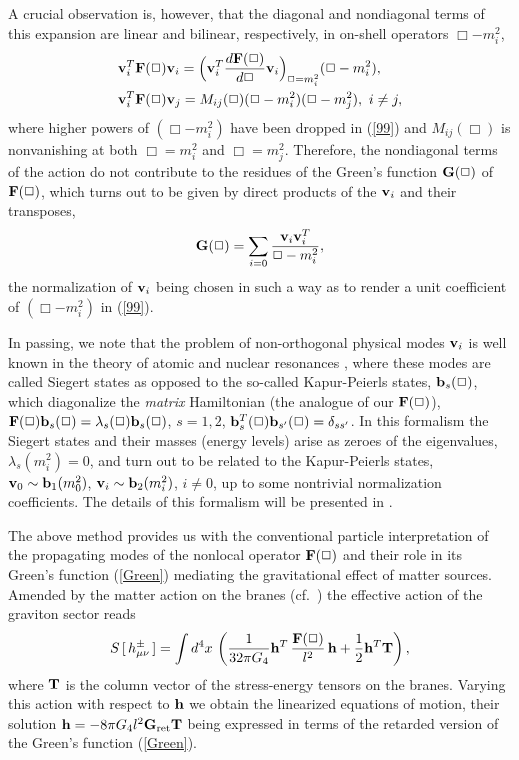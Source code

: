 \documentclass[a4paper,prl,twocolumn,amsmath,amssymb,showpacs]{revtex4}
\begin{document}
A crucial observation is, however, that the diagonal and nondiagonal 
terms of this expansion are linear and bilinear, respectively, in on-shell  
operators $\Box-m_i^2$,  
\begin{align} 
&{\bf v}^T_i {\bf F}(\Box) {\bf v}_i  
= \Big({\bf v}^T_i \frac{d{\bf F}(\Box)}{d\Box} 
{\bf v}_i\Big)_{\Box = m_i^2} (\Box - m_i^2),\label{99}\\ 
&{\bf v}^T_i {\bf F}(\Box) {\bf v}_j  
= M_{ij}(\Box)(\Box - m_i^2)(\Box - m_j^2),\,\,i\neq j, \label{100} 
\end{align} 
where higher powers of $(\Box-m_i^2)$ have been dropped in (\ref{99}) and
$M_{ij}(\Box)$ is nonvanishing at both $\Box=m_i^2$ and $\Box=m_j^2$.
Therefore, the nondiagonal terms of the action do not contribute to the
residues of the Green's function ${\bf G}(\Box)$ of ${\bf F}(\Box)$, which
turns out to be given by direct products of the ${\bf v}_i$ and their
transposes,
\begin{equation}  
{\bf G}(\Box) = \sum_{i=0}  
\frac{{\bf v}_i{\bf v}_i^T} 
{\Box - m_i^2},               \label{Green} 
\end{equation} 
the normalization of ${\bf v}_i$ being 
chosen in such a way as to render a unit 
coefficient of $(\Box-m_i^2)$ in (\ref{99}). 
 
In passing, we 
note that the problem of non-orthogonal physical modes ${\bf v}_i$ is well
known in the theory of atomic and nuclear resonances \cite{More}, where these
modes are called Siegert states as opposed to the so-called Kapur-Peierls
states, ${\bf b}_s(\Box)$, which diagonalize the {\em matrix} Hamiltonian (the
analogue of our ${\bf F}(\Box)$), ${\bf F}(\Box) {\bf b}_s(\Box) =
\lambda_s(\Box) {\bf b}_s(\Box)$, $s=1,2$, ${\bf b}^T_s(\Box){\bf
  b}_{s'}(\Box)=\delta_{ss'}$. In this formalism the Siegert states and their
masses (energy levels) arise as zeroes of the eigenvalues,
$\lambda_s(m_i^2)=0$, and turn out to be related to the Kapur-Peierls states,
${\bf v}_0\sim {\bf b}_1(m_0^2)$, ${\bf v}_i\sim {\bf b}_2(m_i^2)$, $i\neq 0$,
up to some nontrivial normalization coefficients. The details of this
formalism will be presented in 
\cite{tocome}.
 
The above method provides us with the conventional  
particle interpretation of the propagating modes of the nonlocal operator 
${\bf F}(\Box)$ and their role in its Green's function (\ref{Green}) 
mediating the gravitational effect of matter sources. Amended by the  
matter action on the branes (cf.\ \cite{we}) the effective action of the  
graviton sector reads 
\begin{align} 
  S\,[\,h^\pm_{\mu\nu}\,]  
    =\int  
    d^4x\,\left(\frac1{32\pi G_4}  
    {\bf h}^T  
    \,\frac{{\bf  F}(\Box)}{l^2}\,  
    {\bf h}+  \frac12{\bf h}^T {\bf T} \right), 
\end{align} 
where ${\bf T}$ is the column vector of the stress-energy 
tensors on the branes.  Varying this action with respect to ${\bf h}$ we 
obtain the linearized equations of motion, their solution   
${\bf h} =-8\pi G_4 l^2{\bf G}_\text{ret} {\bf T}$ being expressed 
in terms of the retarded version of the Green's function (\ref{Green}).   
 
\end{document}
